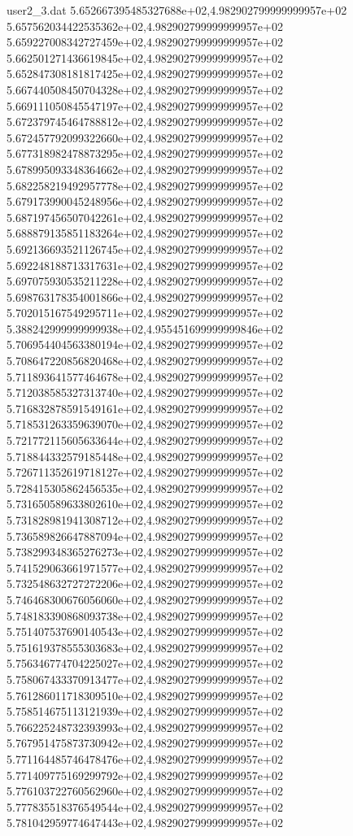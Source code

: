\begin{filecontents}{user2_3.dat}
5.652667395485327688e+02,4.982902799999999957e+02
5.657562034422535362e+02,4.982902799999999957e+02
5.659227008342727459e+02,4.982902799999999957e+02
5.662501271436619845e+02,4.982902799999999957e+02
5.652847308181817425e+02,4.982902799999999957e+02
5.667440508450704328e+02,4.982902799999999957e+02
5.669111050845547197e+02,4.982902799999999957e+02
5.672379745464788812e+02,4.982902799999999957e+02
5.672457792099322660e+02,4.982902799999999957e+02
5.677318982478873295e+02,4.982902799999999957e+02
5.678995093348364662e+02,4.982902799999999957e+02
5.682258219492957778e+02,4.982902799999999957e+02
5.679173990045248956e+02,4.982902799999999957e+02
5.687197456507042261e+02,4.982902799999999957e+02
5.688879135851183264e+02,4.982902799999999957e+02
5.692136693521126745e+02,4.982902799999999957e+02
5.692248188713317631e+02,4.982902799999999957e+02
5.697075930535211228e+02,4.982902799999999957e+02
5.698763178354001866e+02,4.982902799999999957e+02
5.702015167549295711e+02,4.982902799999999957e+02
5.388242999999999938e+02,4.955451699999999846e+02
5.706954404563380194e+02,4.982902799999999957e+02
5.708647220856820468e+02,4.982902799999999957e+02
5.711893641577464678e+02,4.982902799999999957e+02
5.712038585327313740e+02,4.982902799999999957e+02
5.716832878591549161e+02,4.982902799999999957e+02
5.718531263359639070e+02,4.982902799999999957e+02
5.721772115605633644e+02,4.982902799999999957e+02
5.718844332579185448e+02,4.982902799999999957e+02
5.726711352619718127e+02,4.982902799999999957e+02
5.728415305862456535e+02,4.982902799999999957e+02
5.731650589633802610e+02,4.982902799999999957e+02
5.731828981941308712e+02,4.982902799999999957e+02
5.736589826647887094e+02,4.982902799999999957e+02
5.738299348365276273e+02,4.982902799999999957e+02
5.741529063661971577e+02,4.982902799999999957e+02
5.732548632727272206e+02,4.982902799999999957e+02
5.746468300676056060e+02,4.982902799999999957e+02
5.748183390868093738e+02,4.982902799999999957e+02
5.751407537690140543e+02,4.982902799999999957e+02
5.751619378555303683e+02,4.982902799999999957e+02
5.756346774704225027e+02,4.982902799999999957e+02
5.758067433370913477e+02,4.982902799999999957e+02
5.761286011718309510e+02,4.982902799999999957e+02
5.758514675113121939e+02,4.982902799999999957e+02
5.766225248732393993e+02,4.982902799999999957e+02
5.767951475873730942e+02,4.982902799999999957e+02
5.771164485746478476e+02,4.982902799999999957e+02
5.771409775169299792e+02,4.982902799999999957e+02
5.776103722760562960e+02,4.982902799999999957e+02
5.777835518376549544e+02,4.982902799999999957e+02
5.781042959774647443e+02,4.982902799999999957e+02

\end{filecontents}

